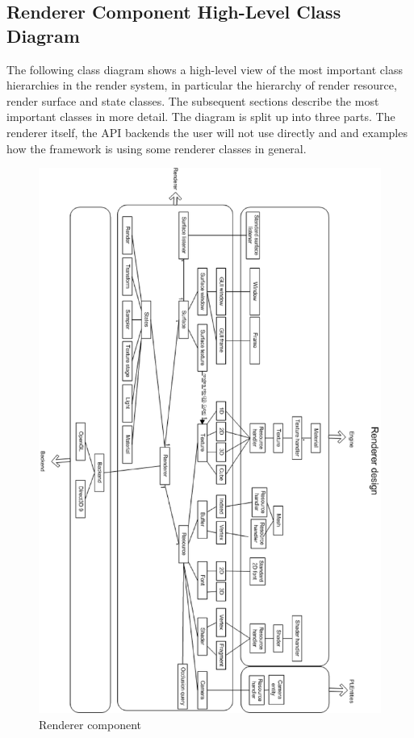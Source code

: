 \subsection{Renderer Component High-Level Class Diagram}
The following class diagram shows a high-level view of the most important class hierarchies in the render system, in particular the hierarchy of render resource, render surface and state classes. The subsequent sections describe the most important classes in more detail. The diagram is split up into three parts. The renderer itself, the \ac{API} backends the user will not use directly and and examples how the framework is using some renderer classes in general.

\begin{figure}
  \centering
  \includegraphics[scale=0.7]{pics/PLRendererClassDiagram.eps}
  \caption{Renderer component}
  \label{fig:Renderer component high-level class diagram}
\end{figure}





